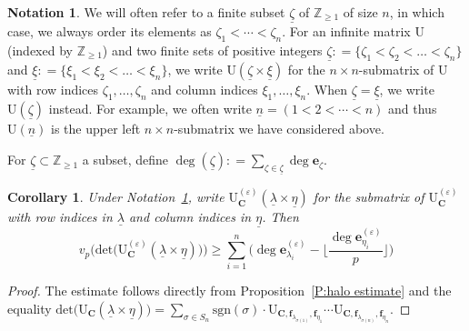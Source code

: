 \documentclass[12pt]{amsart}
\newcommand{\bin}[1]{{\color{red} \sf $\heartsuit\heartsuit\heartsuit$ Bin: [#1]}}
\newtheorem{corollary}[subsection]{Corollary}
\theoremstyle{definition}
\newtheorem{notation}[subsection]{Notation}
\numberwithin{equation}{subsection}
\def\ZZ{\mathbb{Z}}
\def\bfe{\mathbf{e}}
\def\bff{\mathbf{f}}
\def\bfC{\mathbf{C}}
\def\rmU{\mathrm{U}}
\renewcommand{\det}{\mathrm{det}}
\newcommand{\sgn}{\mathrm{sgn}}
\begin{document}





\begin{notation}
\label{N:matrices indexed by xi}
We will often refer to a finite subset $\underline \zeta$ of $\ZZ_{\geq 1}$ of size $n$, in which case, we always order its elements as $\zeta_1 < \cdots < \zeta_n$. 
For an infinite matrix $\rmU$ (indexed by $\ZZ_{\geq 1}$) and two finite sets of positive integers
$\underline \zeta: = \{\zeta_1<\zeta_2<\dots<\zeta_n\}$ and $\underline \xi: = \{\xi_1<\xi_2<\dots<\xi_n\}$, we write $\rmU(\underline \zeta \times \underline \xi)$ for the $n\times n$-submatrix of $\rmU$ with row indices $\zeta_1, \dots, \zeta_n$ and column indices $\xi_1, \dots, \xi_n$. 
When $\underline \zeta = \underline \xi$, we write $\rmU(\underline \zeta) $ instead.
For example, we often write $\underline n = (1<2<\cdots<n)$ and thus $\rmU(\underline n)$ is the upper left $n\times n$-submatrix we have considered above.

For $\underline \zeta \subset \ZZ_{\geq 1}$ a subset, define $\deg(\underline \zeta) : = \sum\limits_{\zeta \in \underline \zeta} \deg \bfe_\zeta$.
\end{notation}

\begin{corollary}
	\label{C:halo estimate on det U C lambda xi}
	Under Notation~\ref{N:matrices indexed by xi}, write $\rmU^{(\varepsilon)}_{\bfC}(\underline \lambda \times \underline \eta)$ for the submatrix of $\rmU^{(\varepsilon)}_{\bfC}$ with row indices in $\underline \lambda$ and column indices in $\underline \eta$. Then
	$$
	\label{E:halo estimate on det U C lambda xi}
	v_p\big(\det \big( \rmU^{(\varepsilon)}_{\bfC}(\underline \lambda \times \underline \eta)\big) \big) \geq  \sum_{i=1}^n \Big(\deg \bfe^{(\varepsilon)}_{\lambda_i} - \Big\lfloor \frac{\deg \bfe^{(\varepsilon)}_{\eta_i}}p \Big\rfloor\Big)
	$$
\end{corollary}
\begin{proof}
The estimate follows directly from Proposition~\ref{P:halo estimate} and the equality $\det \big(\rmU_\bfC(\underline \lambda \times \underline \eta)\big) = \sum\limits_{ \sigma \in S_n}\sgn(\sigma)\cdot \rmU_{\bfC,\bff_{\lambda_{\sigma(1)}}, \bff_{\eta_1}}\cdots \rmU_{\bfC,\bff_{\lambda_{\sigma(n)}}, \bff_{\eta_n}}$.
\end{proof}
\end{document}
